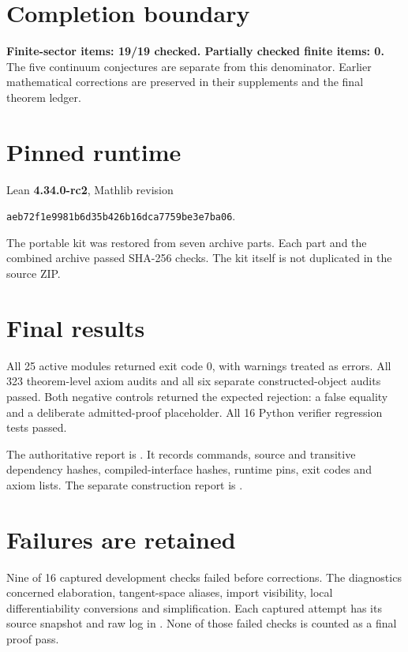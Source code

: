 \documentclass[10pt,letterpaper]{article}
\newcommand{\pageheading}[2]{\vspace*{2pt}{\small\color{ink}\textsc{#1}}\par\vspace{2pt}{\Large\bfseries #2}\par\vspace{4pt}}
\begin{document}
\section*{Completion boundary}
\textbf{Finite-sector items: 19/19 checked. Partially checked finite items: 0.}
The five continuum conjectures are separate from this denominator. Earlier mathematical corrections are preserved in their supplements and the final theorem ledger.

\newpage
\pageheading{Verification and reproducibility}{Final checked release evidence}
\section*{Pinned runtime}
Lean \textbf{4.34.0-rc2}, Mathlib revision
\begin{center}\small\texttt{aeb72f1e9981b6d35b426b16dca7759be3e7ba06}.\end{center}
The portable kit was restored from seven archive parts. Each part and the combined archive passed SHA-256 checks. The kit itself is not duplicated in the source ZIP.

\section*{Final results}
All 25 active modules returned exit code 0, with warnings treated as errors. All 323 theorem-level axiom audits and all six separate constructed-object audits passed. Both negative controls returned the expected rejection: a false equality and a deliberate admitted-proof placeholder. All 16 Python verifier regression tests passed.

The authoritative report is
.
It records commands, source and transitive dependency hashes, compiled-interface hashes, runtime pins, exit codes and axiom lists. The separate construction report is
.

\section*{Failures are retained}
Nine of 16 captured development checks failed before corrections. The diagnostics concerned elaboration, tangent-space aliases, import visibility, local differentiability conversions and simplification. Each captured attempt has its source snapshot and raw log in . None of those failed checks is counted as a final proof pass.
\end{document}
